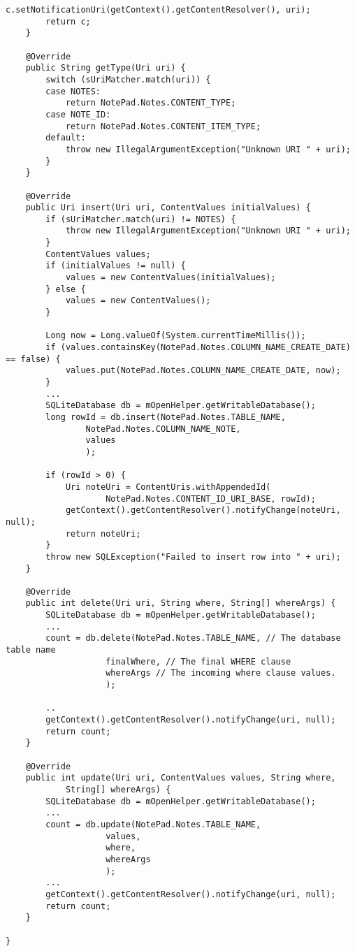 \begin{lstlisting}[frame=single, caption=ContentProvider 예, label=src:provider]
		c.setNotificationUri(getContext().getContentResolver(), uri);
		return c;
	}

	@Override
	public String getType(Uri uri) {
		switch (sUriMatcher.match(uri)) {
		case NOTES:
			return NotePad.Notes.CONTENT_TYPE;
		case NOTE_ID:
			return NotePad.Notes.CONTENT_ITEM_TYPE;
		default:
			throw new IllegalArgumentException("Unknown URI " + uri);
		}
	}

	@Override
	public Uri insert(Uri uri, ContentValues initialValues) {
		if (sUriMatcher.match(uri) != NOTES) {
			throw new IllegalArgumentException("Unknown URI " + uri);
		}
		ContentValues values;
		if (initialValues != null) {
			values = new ContentValues(initialValues);
		} else {
			values = new ContentValues();
		}

		Long now = Long.valueOf(System.currentTimeMillis());
		if (values.containsKey(NotePad.Notes.COLUMN_NAME_CREATE_DATE) == false) {
			values.put(NotePad.Notes.COLUMN_NAME_CREATE_DATE, now);
		}
		...
		SQLiteDatabase db = mOpenHelper.getWritableDatabase();
		long rowId = db.insert(NotePad.Notes.TABLE_NAME,
				NotePad.Notes.COLUMN_NAME_NOTE, 
				values 
				);

		if (rowId > 0) {
			Uri noteUri = ContentUris.withAppendedId(
					NotePad.Notes.CONTENT_ID_URI_BASE, rowId);
			getContext().getContentResolver().notifyChange(noteUri, null);
			return noteUri;
		}
		throw new SQLException("Failed to insert row into " + uri);
	}

	@Override
	public int delete(Uri uri, String where, String[] whereArgs) {
		SQLiteDatabase db = mOpenHelper.getWritableDatabase();
		...
		count = db.delete(NotePad.Notes.TABLE_NAME, // The database table name
					finalWhere, // The final WHERE clause
					whereArgs // The incoming where clause values.
					);

		..
		getContext().getContentResolver().notifyChange(uri, null);
		return count;
	}

	@Override
	public int update(Uri uri, ContentValues values, String where,
			String[] whereArgs) {
		SQLiteDatabase db = mOpenHelper.getWritableDatabase();
		...
		count = db.update(NotePad.Notes.TABLE_NAME, 
					values, 
					where, 
					whereArgs 
					);
		...
		getContext().getContentResolver().notifyChange(uri, null);
		return count;
	}

}
\end{lstlisting}
